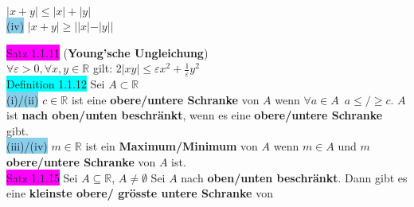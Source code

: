 \documentclass[landscape, 10pt]{article}
\newcommand{\R}{\mathbb{R}}
\begin{document}
\begin{multicols}{3}
\begin{multicols}{2}
                            \textcolor{NavyBlue}{
                            $|x+y|\leqslant |x|+|y|$}\\
                     \colorbox{SkyBlue}{(iv)} 
                            \textcolor{NavyBlue}{
                            $|x+y|\geqslant ||x|-|y||$}
                     \end{multicols}
              \colorbox{magenta}{Satz 1.1.11}
              (\textbf{Young'sche Ungleichung})\\
                     \textcolor{NavyBlue}{
                     $\forall\varepsilon >0, \forall x,y\in\R$} 
                     gilt: \qquad \textcolor{NavyBlue}{
                     $2|xy|\leqslant\varepsilon 
                     x^2+\frac{1}{\varepsilon}y^2$}\\
              \colorbox{cyan}{Definition 1.1.12} 
                     Sei \textcolor{NavyBlue}{$A\subset\R$}\\
                     \colorbox{SkyBlue}{(i)/(ii)}
                            \textcolor{NavyBlue}{
                            $c\in\R$} ist eine 
                            \textbf{obere/untere Schranke }
                            von \textcolor{NavyBlue}{$A$} 
                            wenn \textcolor{NavyBlue}{
                            $\forall a \in A \enspace a
                            \leqslant / \geqslant c$}. 
                            \textcolor{NavyBlue}{$A$} ist 
                            \textbf{nach oben/unten beschränkt}, 
                            wenn es eine \textbf{obere/untere 
                            Schranke} gibt.\\
                     \colorbox{SkyBlue}{(iii)/(iv)} 
                            \textcolor{NavyBlue}{$m\in\R$} ist ein 
                            \textbf{Maximum/Minimum} von 
                            \textcolor{NavyBlue}{$A$} wenn 
                            \textcolor{NavyBlue}{$m\in A$} und 
                            \textcolor{NavyBlue}{$m$} 
                            \textbf{obere/untere Schranke} von 
                            \textcolor{NavyBlue}{$A$} ist. \\
              \colorbox{magenta}{Satz 1.1.15}  
                     Sei \textcolor{NavyBlue}{$A\subseteq\R$}, 
                     \textcolor{NavyBlue}{$A\neq\emptyset$} Sei 
                     \textcolor{NavyBlue}{$A$}
                     nach \textbf{oben/unten beschränkt}. 
                     Dann gibt es eine \textbf{kleinste obere/ grösste 
                     untere Schranke} von 

\end{multicols}
\end{document}

